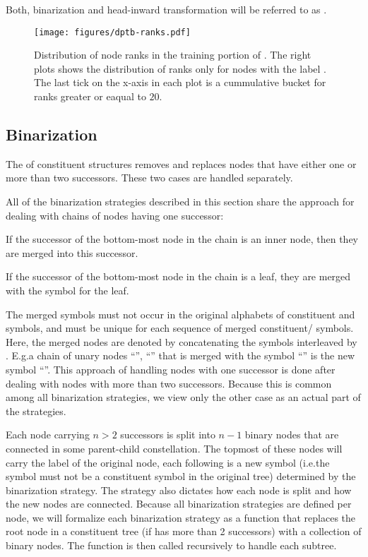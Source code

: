 \documentclass[../../document.tex]{subfiles}
\begin{document}
    Both, binarization and head-inward transformation will be referred to as .

    \begin{figure}
        \texttt{[image: figures/dptb-ranks.pdf]}
        \caption{\label{fig:extraction:ranks}
            Distribution of node ranks in the training portion of .
            The right plots shows the distribution of ranks only for nodes with the label .
            The last tick on the x-axis in each plot is a cummulative bucket for ranks greater or eaqual to \(20\).
        }
    \end{figure}

    \subsection{Binarization}
    The  of constituent structures removes and replaces nodes that have either one or more than two successors.
    These two cases are handled separately.

    All of the binarization strategies described in this section share the approach for dealing with chains of nodes having one successor:
    \begin{inparaenum}
        \item If the successor of the bottom-most node in the chain is an inner node, then they are merged into this successor.
        \item If the successor of the bottom-most node in the chain is a leaf, they are merged with the  symbol for the leaf.
    \end{inparaenum}
    The merged symbols must not occur in the original alphabets of constituent and  symbols, and must be unique for each sequence of merged constituent/ symbols.
    Here, the merged nodes are denoted by concatenating the symbols interleaved by \cn{+}.
    E.g.\@ a chain of unary nodes ``'', ``'' that is merged with the  symbol ``'' is the new symbol ``''.
    This approach of handling nodes with one successor is done after dealing with nodes with more than two successors.
    Because this is common among all binarization strategies, we view only the other case as an actual part of the strategies.

    Each node carrying \( n > 2 \) successors is split into \( n-1 \) binary nodes that are connected in some parent-child constellation.
    The topmost of these nodes will carry the label of the original node, each following is a new symbol (i.e.\@ the symbol must not be a constituent symbol in the original tree) determined by the binarization strategy.
    The strategy also dictates how each node is split and how the new nodes are connected.
    Because all binarization strategies are defined per node, we will formalize each binarization strategy as a function that replaces the root node in a constituent tree (if has more than 2 successors) with a collection of binary nodes.
    The function is then called recursively to handle each subtree.
\end{document}

